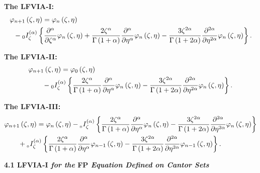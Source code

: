 \documentclass[10pt]{NSP1}
\begin{document}
\noindent
{\bf The LFVIA-I:}
\begin{align}
\label{eq29}
&\varphi _{n+1} \left( {\zeta ,\eta } \right)
 =\varphi _n \left( {\zeta ,\eta } \right)\notag \\
&\;\;-{ }_0I_\zeta ^{\left( \alpha
\right)}\left\{ {\frac{\partial ^\alpha }{\partial \zeta ^\alpha }\varphi _n
\left( {\zeta ,\eta } \right)+\frac{2\zeta ^\alpha }{\Gamma \left( {1+\alpha
} \right)}\frac{\partial ^\alpha }{\partial \eta ^\alpha }\varphi _n \left(
{\zeta ,\eta } \right)-\frac{3\zeta ^{2\alpha }}{\Gamma \left( {1+2\alpha }
\right)}\frac{\partial ^{2\alpha }}{\partial \eta ^{2\alpha }}\varphi _n
\left( {\zeta ,\eta } \right)} \right\} .
\end{align}

\noindent
{\bf The LFVIA-II:}
\begin{align}
\label{eq30}
&\varphi _{n+1} \left( {\zeta ,\eta } \right)=\varphi _0 \left( {\zeta ,\eta
} \right)\notag\\
&\qquad -{ }_0I_\zeta ^{\left( \alpha \right)}\left\{ {\frac{2\zeta ^\alpha
}{\Gamma \left( {1+\alpha } \right)}\frac{\partial ^\alpha }{\partial \eta
^\alpha }\varphi _n \left( {\zeta ,\eta } \right)-\frac{3\zeta ^{2\alpha
}}{\Gamma \left( {1+2\alpha } \right)}\frac{\partial ^{2\alpha }}{\partial
\eta ^{2\alpha }}\varphi _n \left( {\zeta ,\eta } \right)} \right\}.
\end{align}

\noindent
{\bf The LFVIA-III:}
\begin{align}
\label{eq31}
&\varphi _{n+1} \left( {\zeta ,\eta } \right)=\varphi _n \left( {\zeta ,\eta
} \right)-{ }_{_0 }I_\zeta ^{\left( \alpha \right)}\left\{ {\frac{2\zeta
^\alpha }{\Gamma \left( {1+\alpha } \right)}\frac{\partial ^\alpha
}{\partial \eta ^\alpha }\varphi _n \left( {\zeta ,\eta }
\right)-\frac{3\zeta ^{2\alpha }}{\Gamma \left( {1+2\alpha }
\right)}\frac{\partial ^{2\alpha }}{\partial \eta ^{2\alpha }}\varphi _n
\left( {\zeta ,\eta } \right)} \right\} \notag \\
&\qquad  +{ }_{_0 }I_\zeta ^{\left( \alpha \right)}\left\{ {\frac{2\zeta ^\alpha
}{\Gamma \left( {1+\alpha } \right)}\frac{\partial ^\alpha }{\partial \eta
^\alpha }\varphi _{n-1} \left( {\zeta ,\eta } \right)-\frac{3\zeta ^{2\alpha
}}{\Gamma \left( {1+2\alpha } \right)}\frac{\partial ^{2\alpha }}{\partial
\eta ^{2\alpha }}\varphi _{n-1} \left( {\zeta ,\eta } \right)} \right\}.
\end{align}

\vskip 2mm

\noindent
\textbf{4.1\; LFVIA-I \; \textit{for the} FP \textit{Equation Defined on Cantor Sets}}\\[2mm]
\end{document}
